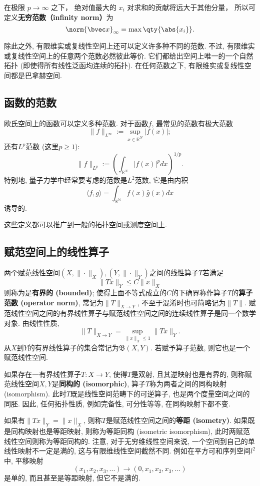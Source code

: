 在极限 $p \to \infty$ 之下， 绝对值最大的 $x_i$ 对求和的贡献将远大于其他分量， 所以可定义\textbf{无穷范数（infinity norm）}为
\begin{equation}
\norm{\bvec x}_\infty = \max \qty{\abs{x_i}}.
\end{equation}

除此之外, 有限维实或复线性空间上还可以定义许多种不同的范数. 不过, 有限维实或复线性空间上的任意两个范数必然彼此等价. 它们都给出空间上唯一的一个自然拓扑 (即使得所有线性泛函均连续的拓扑). 在任何范数之下, 有限维实或复线性空间都是巴拿赫空间.

\subsection{函数的范数}
欧氏空间上的函数可以定义多种范数. 对于函数$f$, 最常见的范数有极大范数
$$
\|f\|_{L^\infty}:=\sup_{x\in\mathbb{R}^N}|f(x)|;
$$
还有$L^p$范数 (这里$p\geq1$):
$$
\|f\|_{L^p}:=\left(\int_{\mathbb{R}^N}|f(x)|^pdx\right)^{1/p}.
$$
特别地, 量子力学中经常要考虑的范数是$L^2$范数, 它是由内积
$$
\langle f,g\rangle=\int_{\mathbb{R^N}}f(x)\bar g(x)dx
$$
诱导的.

这些定义都可以推广到一般的拓扑空间或测度空间上.

\subsection{赋范空间上的线性算子}
两个赋范线性空间$(X,\|\cdot\|_X),(Y,\|\cdot\|_Y)$之间的线性算子$T$若满足
$$
\|Tx\|_Y\leq C\|x\|_X
$$
则称为是\textbf{有界的 (bounded)}; 使得上面不等式成立的$C$的下确界称作算子$T$的\textbf{算子范数 (operator norm)}, 常记为$\|T\|_{X\to Y}$, 不至于混淆时也可简略记为$\|T\|$. 赋范线性空间之间的有界线性算子与赋范线性空间之间的连续线性算子是同一个数学对象. 由线性性质,
$$
\|T\|_{X\to Y}=\sup_{\|x\|_X\leq 1}\|Tx\|_Y.
$$
从$X$到$Y$的有界线性算子的集合常记为$\mathfrak{B}(X,Y)$. 若赋予算子范数, 则它也是一个赋范线性空间.

如果存在一有界线性算子$T:X\to Y$, 使得$T$是双射, 且其逆映射也是有界的, 则称赋范线性空间$X,Y$是\textbf{同构的 (isomorphic)}, 算子$T$称为两者之间的同构映射 (isomorphism). 此时$T$既是线性空间范畴下的可逆算子, 也是两个度量空间之间的同胚. 因此, 任何拓扑性质, 例如完备性, 可分性等等, 在同构映射下都不变. 

如果有$\|Tx\|_Y=\|x\|_X$, 则称$T$是赋范线性空间之间的\textbf{等距 (isometry)}. 如果既是同构映射也是等距映射, 则称为等距同构 (isometric isomorphism), 此时两赋范线性空间则称为等距同构的. 注意, 对于无穷维线性空间来说, 一个空间到自己的单线性映射不一定是满的, 这与有限维线性空间截然不同. 例如在平方可和序列空间$l^2$中, 平移映射
$$
(x_1,x_2,x_3,...)\to(0,x_1,x_2,x_3,...)
$$
是单的, 而且甚至是等距映射, 但它不是满的.

